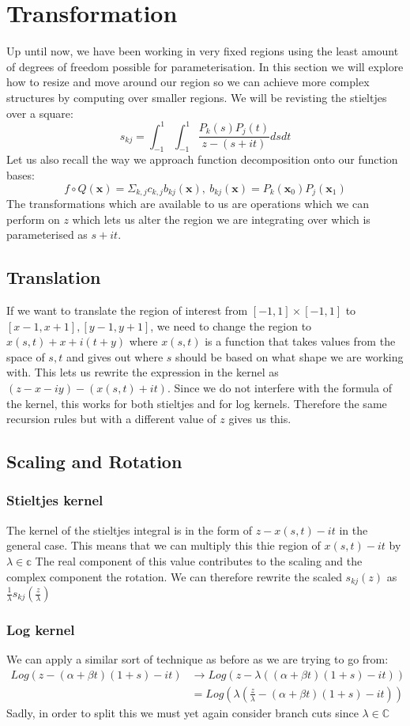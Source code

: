 \documentclass{article}
\begin{document}
\section{Transformation}
Up until now, we have been working in very fixed regions using the least amount of degrees of freedom possible for parameterisation.
In this section we will explore how to resize and move around our region so we can achieve more complex structures by computing over smaller regions.
We will be revisting the stieltjes over a square:
$$s_{kj} = \int_{-1}^1\int_{-1}^1\frac{P_k(s)P_j(t)}{z-(s+it)}dsdt$$
Let us also recall the way we approach function decomposition onto our function bases:
$$f\circ Q(\textbf{x})=\Sigma_{k,j}c_{k,j}b_{kj}(\textbf{x}),\:b_{kj}(\textbf{x})=P_k(\textbf{x}_0)P_j(\textbf{x}_1)$$
The transformations which are available to us are operations which we can perform on $z$ which lets us alter the region we are integrating over which is parameterised as $s+it$.

\subsection{Translation}
If we want to translate the region of interest from $[-1,1]\times[-1,1]$ to $[x-1,x+1],[y-1,y+1]$, we need to change the region to $x(s,t)+x+i(t+y)$ where $x(s,t)$ is a function that takes values from the space of $s,t$ and gives out where $s$ should be based on what shape we are working with.
This lets us rewrite the expression in the kernel as $(z-x-iy)-(x(s,t)+it)$.
Since we do not interfere with the formula of the kernel, this works for both stieltjes and for log kernels.
Therefore the same recursion rules but with a different value of $z$ gives us this.

\subsection{Scaling and Rotation}
\subsubsection{Stieltjes kernel}
The kernel of the stieltjes integral is in the form of $z-x(s,t)-it$ in the general case.
This means that we can multiply this thie region of $x(s,t)-it$ by $\lambda\in\mathbb{c}$
The real component of this value contributes to the scaling and the complex component the rotation.
We can therefore rewrite the scaled $s_{kj}(z)$ as $\frac{1}{\lambda}s_{kj}(\frac{z}{\lambda})$
\subsubsection{Log kernel}
We can apply a similar sort of technique as before as we are trying to go from:
\begin{align}
    Log(z-(\alpha+\beta t)(1+s)-it)&\rightarrow Log(z-\lambda((\alpha+\beta t)(1+s)-it))\\
    &= Log(\lambda(\frac{z}{\lambda}-(\alpha+\beta t)(1+s)-it))
\end{align}
Sadly, in order to split this we must yet again consider branch cuts since $\lambda\in\mathbb{C}$
\end{document}
